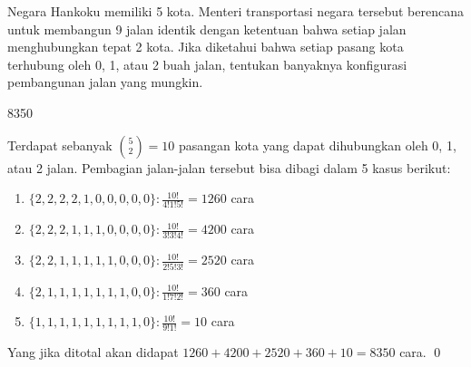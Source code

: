 \documentclass[11pt]{scrartcl}
\begin{document}
	\begin{soaljawab}
		Negara Hankoku memiliki 5 kota. Menteri transportasi negara tersebut berencana untuk
		membangun 9 jalan identik dengan ketentuan bahwa setiap jalan menghubungkan
		tepat 2 kota. Jika diketahui bahwa setiap pasang kota terhubung oleh 0, 1, atau 2
		buah jalan, tentukan banyaknya konfigurasi pembangunan jalan yang mungkin.
		
		\begin{jawaban}
		8350
		\end{jawaban}
		\begin{solusi}
		Terdapat sebanyak ${5 \choose 2} = 10$ pasangan kota yang dapat dihubungkan oleh 0, 1, atau 2 jalan. Pembagian jalan-jalan tersebut bisa dibagi dalam 5 kasus berikut:
		\begin{enumerate}
			\item $\{2,2,2,2,1,0,0,0,0,0\}: \frac{10!}{4!1!5!}=1260$ cara
			\item $\{2,2,2,1,1,1,0,0,0,0\}: \frac{10!}{3!3!4!}=4200$ cara
			\item $\{2,2,1,1,1,1,1,0,0,0\}: \frac{10!}{2!5!3!}=2520$ cara
			\item $\{2,1,1,1,1,1,1,1,0,0\}: \frac{10!}{1!7!2!}=360$ cara
			\item $\{1,1,1,1,1,1,1,1,1,0\}: \frac{10!}{9!1!}=10$ cara
		\end{enumerate}
		Yang jika ditotal akan didapat $1260+4200+2520+360+10=8350$ cara. \qed
		\end{solusi}
	\end{soaljawab}
	
\end{document}
